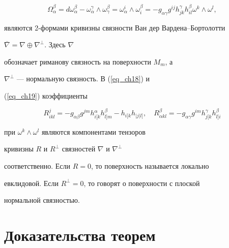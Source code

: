 \begin{equation}


\label{eq_ch19}


\Omega^{\beta}_{\alpha}=d\omega^{\beta}_{\alpha}-\omega^{\gamma}_{\alpha}


\wedge\omega^{\beta}_{\gamma}=\omega^i_{\alpha}\wedge\omega^{\beta}_i=


-g_{\alpha\gamma}g^{ij}h^{\gamma}_{jk}h^{\beta}_{il}\omega^k\wedge\omega^l,


\end{equation}


являются 2-формами кривизны связности Ван дер Вардена--Бортолотти


$\overline{\nabla}=\nabla\oplus\nabla^{\perp}$. Здесь $\nabla$


обозначает риманову связность на поверхности $M_m$, а


$\nabla^{\perp}$ --- нормальную связность. В (\ref{eq_ch18}) и


(\ref{eq_ch19}) коэффициенты


$$


R^j_{ikl}=-g_{\alpha\beta}g^{jm}h{}^{\alpha}_{i[k}


h{}^{\beta}_{l]m}-h{}_{i[k}h{}_{\vert


j\vert l]},\quad R^{\beta}_{\alpha


kl}=-g_{\alpha\gamma}g{}^{im}h^{\gamma}_{j[k}h{}^{\beta}_{l]i}


$$


при $\omega^k\wedge\omega^l$ являются компонентами тензоров


кривизны $R$ и $R^{\perp}$ связностей $\nabla$  и $\nabla^{\perp}$


соответственно. Если $R=0$, то поверхность называется локально


евклидовой. Если $R^{\perp}=0$, то говорят о поверхности с плоской


нормальной связностью.








\section{Доказательства теорем}





